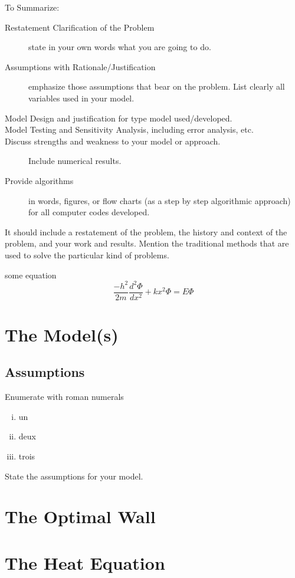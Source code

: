 \documentclass[12pt]{reedmcm}
\begin{document}
To Summarize:
\begin{description}
  \item[Restatement Clarification of the Problem]
    state in your own words what you are going to do.
  \item[Assumptions with Rationale/Justification]
    emphasize those assumptions that bear on the problem. List clearly all variables used in your model.
  \item[Model Design and justification for type model used/developed.]
  \item[Model Testing and Sensitivity Analysis, including error
    analysis, etc.]
  \item[Discuss strengths and weakness to your model or approach.] Include numerical results.
  \item[Provide algorithms] in words, figures, or flow charts (as a step by step algorithmic approach) for all computer codes developed.
\end{description}

It should include a restatement of the problem, the history and context of the problem, and your work and results.
Mention the traditional methods that are used to solve the particular kind of problems.

some equation
\begin{equation*}
  \frac{−h^2}{2m} \frac{d^2\Phi}{dx^2} + kx^2\Phi = E\Phi
\end{equation*}

\section{The Model(s)}
\subsection{Assumptions}
Enumerate with roman numerals
\begin{enumerate}[(i)]
  \item un
  \item deux
  \item trois
\end{enumerate}
State the assumptions for your model.

\section{The Optimal Wall}

\section{The Heat Equation}
\end{document}
